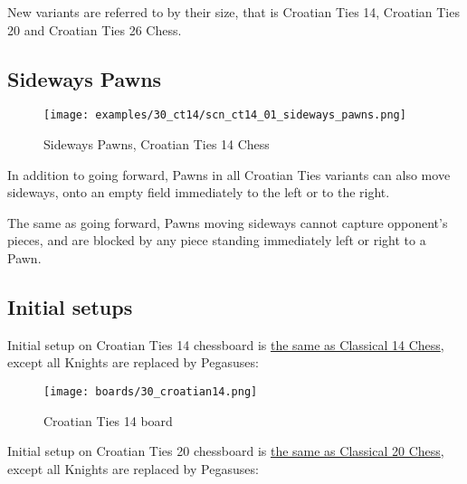 New variants are referred to by their size, that is Croatian Ties 14, Croatian
Ties 20 and Croatian Ties 26 Chess.

\subsection*{Sideways Pawns}
\label{sec:Simple variants/Croatian Ties variants/Sideways Pawns}

\noindent
\begin{wrapfigure}{l}{0.4\textwidth}
\centering
\texttt{[image: examples/30\_ct14/scn\_ct14\_01\_sideways\_pawns.png]}
\caption{Sideways Pawns, Croatian Ties 14 Chess}
\label{fig:scn_ct14_01_sideways_pawns}
\end{wrapfigure}
In addition to going forward, Pawns in all Croatian Ties variants can also move
sideways, onto an empty field immediately to the left or to the right.

The same as going forward, Pawns moving sideways cannot capture opponent's pieces,
and are blocked by any piece standing immediately left or right to a Pawn.

\vfill{}

\clearpage %

\subsection*{Initial setups}
\label{sec:Simple variants/Croatian Ties variants/Initial setups}

Initial setup on Croatian Ties 14 chessboard is
\hyperref[fig:24_classic14]{the same as Classical 14 Chess}, except all Knights
are replaced by Pegasuses:

\noindent
\begin{figure}[h]
\texttt{[image: boards/30\_croatian14.png]}
\caption{Croatian Ties 14 board}
\label{fig:30_croatian14}
\end{figure}

\vfill{}

\clearpage %


Initial setup on Croatian Ties 20 chessboard is
\hyperref[fig:26_classic20]{the same as Classical 20 Chess}, except all Knights
are replaced by Pegasuses:

